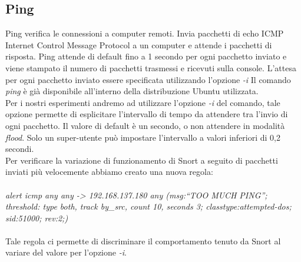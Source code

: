 	\subsection{Ping}
	Ping verifica le connessioni a computer remoti. Invia pacchetti di echo ICMP Internet Control Message Protocol a un computer e attende i pacchetti di risposta. Ping attende di default fino a 1 secondo per ogni pacchetto inviato e viene stampato il numero di pacchetti trasmessi e ricevuti sulla console. L'attesa per ogni pacchetto inviato essere specificata utilizzando l'opzione \textit{-i}
	Il comando \textit{ping} è già disponibile all'interno della distribuzione Ubuntu utilizzata.\\
	Per i nostri esperimenti andremo ad utilizzare l'opzione \textit{-i} del comando, tale opzione permette di esplicitare l'intervallo di tempo da attendere tra l'invio di ogni pacchetto. Il valore di default è un secondo, o non attendere in modalità \textit{flood}. Solo un super-utente può impostare l'intervallo  a valori inferiori di 0,2 secondi.\\
	Per verificare la variazione di funzionamento di Snort a seguito di pacchetti inviati più velocemente abbiamo creato una nuova regola:\\
	\\
	\textit{alert icmp any any -> 192.168.137.180 any (msg:``TOO MUCH PING''; threshold: type both, track by\_src, count 10, seconds 3; classtype:attempted-dos; sid:51000; rev:2;)}\\
	\\	
	Tale regola ci permette di discriminare il comportamento tenuto da Snort al variare del valore per l'opzione \textit{-i}.
	
	
